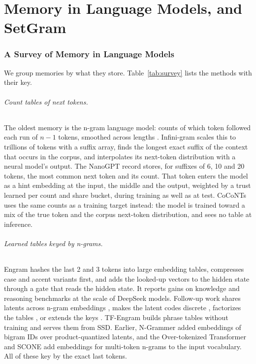 \documentclass[11pt]{article}
\begin{document}
\part{Memory in Language Models, and SetGram}

\section{A Survey of Memory in Language Models}\label{sec:survey}
We group memories by what they store. Table~\ref{tab:survey} lists the methods with their key.

\paragraph{Count tables of next tokens.} The oldest memory is the n-gram language model: counts of which token followed each run of $n-1$ tokens, smoothed across lengths \cite{kneserney}. Infini-gram \cite{infinigram} scales this to trillions of tokens with a suffix array, finds the longest exact suffix of the context that occurs in the corpus, and interpolates its next-token distribution with a neural model's output. The NanoGPT record \cite{brunborg,pr367} stores, for suffixes of 6, 10 and 20 tokens, the most common next token and its count. That token enters the model as a hint embedding at the input, the middle and the output, weighted by a trust learned per count and share bucket, during training as well as at test. CoCoNTs \cite{coconts} uses the same counts as a training target instead: the model is trained toward a mix of the true token and the corpus next-token distribution, and sees no table at inference.

\paragraph{Learned tables keyed by n-grams.} Engram \cite{engram} hashes the last 2 and 3 tokens into large embedding tables, compresses case and accent variants first, and adds the looked-up vectors to the hidden state through a gate that reads the hidden state. It reports gains on knowledge and reasoning benchmarks at the scale of DeepSeek models. Follow-up work shares latents across n-gram embeddings \cite{tengram}, makes the latent codes discrete \cite{lngram}, factorizes the tables \cite{factorengram}, or extends the keys \cite{xgram}. TF-Engram \cite{tfengram} builds phrase tables without training and serves them from SSD. Earlier, N-Grammer \cite{ngrammer} added embeddings of bigram IDs over product-quantized latents, and the Over-tokenized Transformer \cite{overtok} and SCONE \cite{scone} add embeddings for multi-token n-grams to the input vocabulary. All of these key by the exact last tokens.
\end{document}
